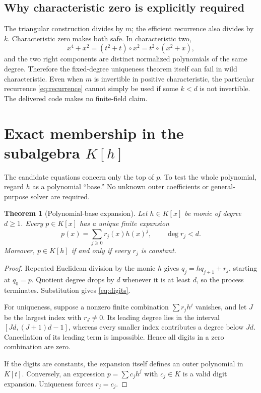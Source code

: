 \documentclass[11pt,a4paper]{article}
\numberwithin{equation}{section}
\newtheorem{theorem}{Theorem}[section]
\theoremstyle{definition}
\theoremstyle{remark}
\begin{document}
\subsection{Why characteristic zero is explicitly required}
The triangular construction divides by $m$; the efficient recurrence also
divides by $k$. Characteristic zero makes both safe. In characteristic two,
\[
 x^4+x^2=(t^2+t)\circ x^2=t^2\circ(x^2+x),
\]
and the two right components are distinct normalized polynomials of the same
degree. Therefore the fixed-degree uniqueness theorem itself can fail in wild
characteristic. Even when $m$ is invertible in positive characteristic, the
particular recurrence \eqref{eq:recurrence} cannot simply be used if some
$k<d$ is not invertible. The delivered code makes no finite-field claim.

\section{Exact membership in the subalgebra \texorpdfstring{$K[h]$}{K[h]}}
\label{sec:digits}
The candidate equations concern only the top of $p$. To test the whole
polynomial, regard $h$ as a polynomial ``base.'' No unknown outer coefficients
or general-purpose solver are required.

\begin{theorem}[Polynomial-base expansion]
\label{thm:digits}
Let $h\in K[x]$ be monic of degree $d\ge1$. Every $p\in K[x]$ has a unique
finite expansion
\begin{equation}
 p(x)=\sum_{j\ge0}r_j(x)h(x)^j,\qquad \deg r_j<d.
 \label{eq:digits}
\end{equation}
Moreover, $p\in K[h]$ if and only if every $r_j$ is constant.
\end{theorem}
\begin{proof}
Repeated Euclidean division by the monic $h$ gives
$q_j=hq_{j+1}+r_j$, starting at $q_0=p$. Quotient degree drops by $d$ whenever
it is at least $d$, so the process terminates. Substitution gives
\eqref{eq:digits}.

For uniqueness, suppose a nonzero finite combination
$\sum r_jh^j$ vanishes, and let $J$ be the largest index with $r_J\ne0$.
Its leading degree lies in the interval $[Jd,(J+1)d-1]$, whereas every smaller
index contributes a degree below $Jd$. Cancellation of its leading term is
impossible. Hence all digits in a zero combination are zero.

If the digits are constants, the expansion itself defines an outer polynomial
in $K[t]$. Conversely, an expression $p=\sum c_jh^j$ with $c_j\in K$ is a
valid digit expansion. Uniqueness forces $r_j=c_j$.
\end{proof}
\end{document}
